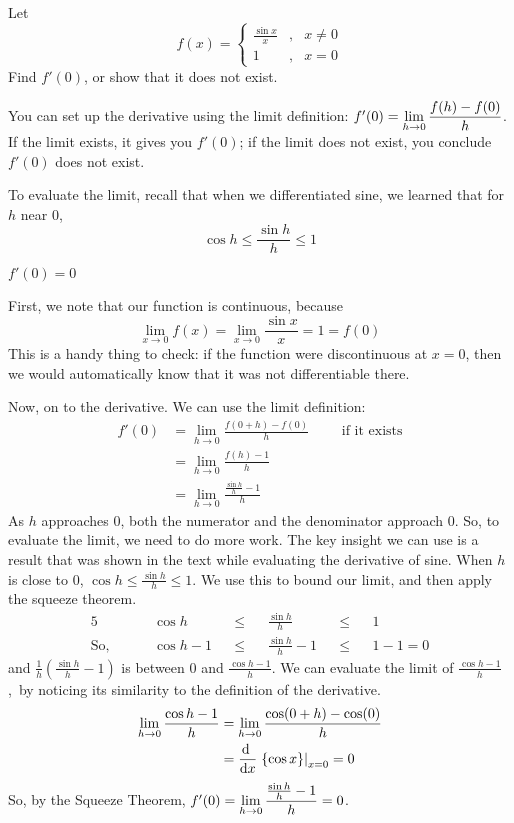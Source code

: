 \begin{question}
Let
\[f(x)=\left\{\begin{array}{ccc}
\frac{\sin x}{x}&,&x \neq 0\\
1&,&x=0
\end{array}\right.\]
Find $f'(0)$, or show that it does not exist.
\end{question}
\begin{hint}
You can set up the derivative using the limit definition: $f'(0)=\displaystyle\lim_{h \to 0}\dfrac{f(h)-f(0)}{h}$. If the limit exists, it gives you $f'(0)$; if the limit does not exist, you conclude $f'(0)$ does not exist.

To evaluate the limit, recall that when we differentiated sine, we learned that for $h$ near 0,
\[\cos h \leq \frac{\sin h}{h}\leq 1\]
\end{hint}
\begin{answer}
$f'(0)=0$
\end{answer}
\begin{solution}
First, we note that our function is continuous, because
\[\lim_{x \to 0} f(x)=\lim_{x \to 0} \frac{\sin x}{x}=1=f(0)\]
This is a handy thing to check: if the function were discontinuous at $x=0$, then we would automatically know that it was not differentiable there.

Now, on to the derivative. We can use the limit definition:
\begin{align*}
f'(0)&=\lim_{h \to 0}\frac{f(0+h)-f(0)}{h}\qquad\mbox{ if it exists}\\
&=\lim_{h \to 0} \frac{f(h)-1}{h}\\
&=\lim_{h \to 0} \frac{\frac{\sin h}{h}-1}{h}
\end{align*}
As $h$ approaches 0, both the numerator and the denominator approach 0. So, to evaluate the limit, we need to do more work. The key insight we can use is a result that was shown in the text while evaluating the derivative of sine. When $h$ is close to 0, $\cos h \leq \frac{\sin h}{h} \leq 1$. We use this to bound our limit, and then apply the squeeze theorem.
\begin{alignat*}{5}
&\cos h&&\leq&&\frac{\sin h}{h}&&\leq&&1\\
\mbox{So, }\qquad&\cos h-1&&\leq&&\frac{\sin h}{h}-1&&\leq&& 1-1=0
\end{alignat*}
and $\frac{1}{h}\left(\frac{\sin h}{h}-1\right)$ is between $0$ and
$\frac{\cos h-1}{h}$.
We can evaluate the limit of $\frac{\cos h-1}{h}$,\ by noticing its similarity to the definition of the derivative.
\begin{align*}
\lim_{h \to 0}\frac{\cos h-1}{h}&=\lim_{h \to 0}\frac{\cos(0+h)-\cos(0)}{h}\\
&=\diff{}{x}\left.\left\{\cos x \right\}\right|_{x=0}=0
\end{align*}
So, by the Squeeze Theorem, $f'(0)
        =\displaystyle\lim_{h \to 0}\frac{\frac{\sin h}{h}-1}{h}=0$.
\end{solution}


